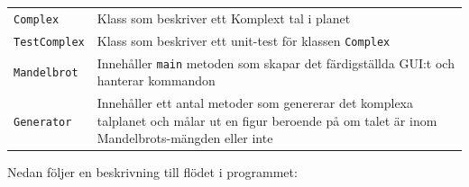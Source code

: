 \documentclass[a4paper]{article}
\newcommand{\code}[1]{\texttt{#1}} %
\begin{document}
\begin{tabular}{lp{8cm}}
\code{Complex} & Klass som beskriver ett Komplext tal i planet \\
\code{TestComplex} & Klass som beskriver ett unit-test för klassen \code{Complex} \\
\code{Mandelbrot} & Innehåller \code{main} metoden som skapar det färdigställda GUI:t och hanterar kommandon \\
\code{Generator} & Innehåller ett antal metoder som genererar det komplexa talplanet och målar ut en figur beroende på om talet är inom Mandelbrots-mängden eller inte \\

\end{tabular}

\vspace{\baselineskip}
Nedan följer en beskrivning till flödet i programmet:
\end{document}
